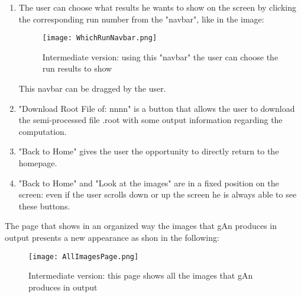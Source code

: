 \begin{enumerate}
\item The user can choose what results he wants to show on the screen by clicking the corresponding run number from the "navbar", like in the image:

\begin{figure}[H]
\centering
\texttt{[image: WhichRunNavbar.png]} 
\caption{Intermediate version: using this "navbar" the user can choose the run results to show}
\end{figure}

This navbar can be dragged by the user.

\item "Download Root File of: nnnn" is a button that allows the user to download the semi-processed file .root with some output information regarding the computation.

\item "Back to Home" gives the user the opportunity to directly return to the homepage. 

\item "Back to Home" and "Look at the images" are in a fixed position on the screen: even if the user scrolls down or up the screen he is always able to see these buttons.    

\end{enumerate}
The page that shows in an organized way the images that gAn produces in output presents a new appearance as shon in the following:



\begin{figure}[H]
\centering
\texttt{[image: AllImagesPage.png]} 
\caption{Intermediate version: this page shows all the images that gAn produces in output}
\end{figure}


